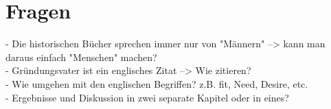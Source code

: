 \section{Fragen}
\label{ch:fazit:fragen}
- Die historischen Bücher sprechen immer nur von "Männern" --> kann man daraus einfach "Menschen" machen?\\ 
- Gründungsvater ist ein englisches Zitat --> Wie zitieren?\\ 
- Wie umgehen mit den englischen Begriffen? z.B. fit, Need, Desire, etc. \\
- Ergebnisse und Diskussion in zwei separate Kapitel oder in eines?

